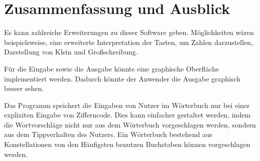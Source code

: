 %

\chapter{Zusammenfassung und Ausblick}

Es kann zahlreiche Erweiterungen zu dieser Software geben. Möglichkeiten wären beispielsweise, eine erweiterte Interpretation der Tasten, um Zahlen darzustellen, Darstellung von Klein und Großschreibung.

Für die Eingabe sowie die Ausgabe könnte eine graphische Oberfläche implementiert werden. Dadurch könnte der Anwender die Ausgabe graphisch besser sehen.

Das Programm speichert die Eingaben von Nutzer im Wörterbuch nur bei einer expliziten Eingabe von Zifferncode. Dies kann einfacher gestaltet werden, indem die Wortvorschläge nicht nur aus dem Wörterbuch vorgeschlagen werden, sondern aus dem Tippverhalten des Nutzers. Ein Wörterbuch bestehend aus Konstellationen von den Häufigsten benutzen Buchstaben können vorgeschlagen werden.